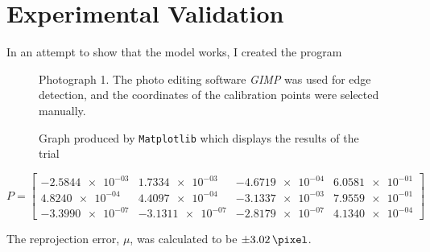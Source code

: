 \section{Experimental Validation}

In an attempt to show that the model works, I created the program

\begin{figure}[H]
    \centering
    \caption{Photograph 1. The photo editing software \emph{GIMP} was used for edge detection, and the coordinates of the calibration points were selected manually. }
\end{figure}



\begin{figure}[H]
    \centering
    \caption{Graph produced by \texttt{Matplotlib} which displays the results of the trial}
\end{figure}

\begin{equation*}
    P =
    \begin{bmatrix}
        \num{-2.5844e-03} & \num{1.7334e-03}  & \num{-4.6719e-04} & \num{6.0581e-01} \\
        \num{4.8240e-04}  & \num{4.4097e-04}  & \num{-3.1337e-03} & \num{7.9559e-01} \\
        \num{-3.3990e-07} & \num{-3.1311e-07} & \num{-2.8179e-07} & \num{4.1340e-04}
    \end{bmatrix}
\end{equation*}




The reprojection error, $\mu$, was calculated to be $\pm \qty{3.02}{\pixel}$.

